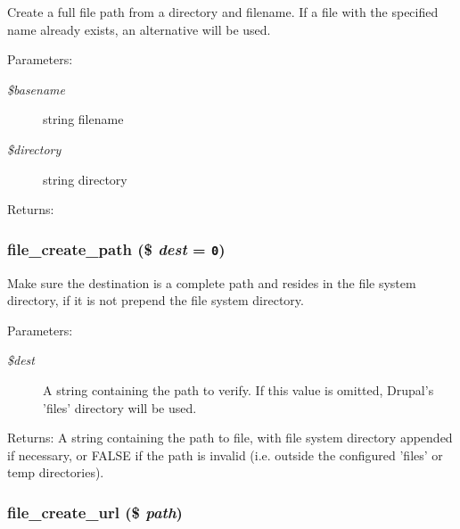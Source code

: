 Create a full file path from a directory and filename. If a file with the specified name already exists, an alternative will be used.

\begin{Desc}
\item[Parameters:]
\begin{description}
\item[{\em \$basename}]string filename \item[{\em \$directory}]string directory \end{description}
\end{Desc}
\begin{Desc}
\item[Returns:]\end{Desc}
\hypertarget{group__file_g306337da81ebf20aa858167c0ca5a979}{
\subsubsection[{file\_\-create\_\-path}]{\setlength{\rightskip}{0pt plus 5cm}file\_\-create\_\-path (\$ {\em dest} = {\tt 0})}}
\label{group__file_g306337da81ebf20aa858167c0ca5a979}


Make sure the destination is a complete path and resides in the file system directory, if it is not prepend the file system directory.

\begin{Desc}
\item[Parameters:]
\begin{description}
\item[{\em \$dest}]A string containing the path to verify. If this value is omitted, Drupal's 'files' directory will be used. \end{description}
\end{Desc}
\begin{Desc}
\item[Returns:]A string containing the path to file, with file system directory appended if necessary, or FALSE if the path is invalid (i.e. outside the configured 'files' or temp directories). \end{Desc}
\hypertarget{group__file_g1a305a4da1e6e5c6b1783ceffb66c340}{
\subsubsection[{file\_\-create\_\-url}]{\setlength{\rightskip}{0pt plus 5cm}file\_\-create\_\-url (\$ {\em path})}}
\label{group__file_g1a305a4da1e6e5c6b1783ceffb66c340}


